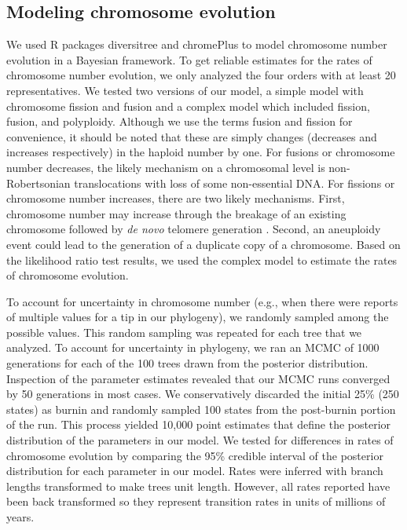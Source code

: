 \subsection{Modeling chromosome evolution}
We used R packages diversitree \citep{fitzjohn2012} and chromePlus \citep{blackmon2019meiotic} to model chromosome number evolution in a Bayesian framework.
To get reliable estimates for the rates of chromosome number evolution, we only analyzed the four orders with at least 20 representatives.
We tested two versions of our model, a simple model with chromosome fission and fusion and a complex model which included fission, fusion, and polyploidy.
Although we use the terms fusion and fission for convenience, it should be noted that these are simply changes (decreases and increases respectively) in the haploid number by one.
For fusions or chromosome number decreases, the likely mechanism on a chromosomal level is non-Robertsonian translocations with loss of some non-essential DNA.
For fissions or chromosome number increases, there are two likely mechanisms.
First, chromosome number may increase through the breakage of an existing chromosome followed by \textit{de novo} telomere generation \citep{harrington1991, tsujimoto1999}.
Second, an aneuploidy event could lead to the generation of a duplicate copy of a chromosome.
Based on the likelihood ratio test results, we used the complex model to estimate the rates of chromosome evolution.

To account for uncertainty in chromosome number (e.g., when there were reports of multiple values for a tip in our phylogeny), we randomly sampled among the possible values.
This random sampling was repeated for each tree that we analyzed.
To account for uncertainty in phylogeny, we ran an MCMC of 1000 generations for each of the 100 trees drawn from the posterior distribution.
Inspection of the parameter estimates revealed that our MCMC runs converged by 50 generations in most cases.  
We conservatively discarded the initial 25\% (250 states) as burnin and randomly sampled 100 states from the post-burnin portion of the run. 
This process yielded 10,000 point estimates that define the posterior distribution of the parameters in our model.
We tested for differences in rates of chromosome evolution by comparing the 95\% credible interval of the posterior distribution for each parameter in our model.
Rates were inferred with branch lengths transformed to make trees unit length.
However, all rates reported have been back transformed so they represent transition rates in units of millions of years.

